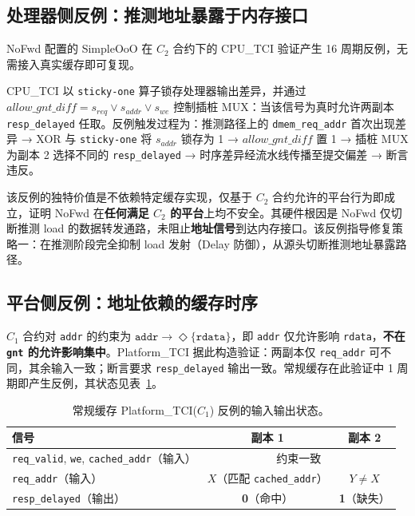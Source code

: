 \subsection{处理器侧反例：推测地址暴露于内存接口}
\label{subsec:ch5_cex_nofwd}

NoFwd 配置的 SimpleOoO 在 $C_2$ 合约下的 CPU\_TCI 验证产生 16 周期反例，无需接入真实缓存即可复现。

CPU\_TCI 以 \texttt{sticky-one} 算子锁存处理器输出差异，并通过 $\textit{allow\_gnt\_diff} = s_{\textit{req}} \vee s_{\textit{addr}} \vee s_{\textit{we}}$ 控制插桩 MUX：当该信号为真时允许两副本 \texttt{resp\_delayed} 任取。反例触发过程为：推测路径上的 \texttt{dmem\_req\_addr} 首次出现差异 → XOR 与 \texttt{sticky-one} 将 $s_{\textit{addr}}$ 锁存为 1 → $\textit{allow\_gnt\_diff}$ 置 1 → 插桩 MUX 为副本 2 选择不同的 \texttt{resp\_delayed} → 时序差异经流水线传播至提交偏差 → 断言违反。

该反例的独特价值是不依赖特定缓存实现，仅基于 $C_2$ 合约允许的平台行为即成立，证明 NoFwd 在\textbf{任何满足 $C_2$ 的平台}上均不安全。其硬件根因是 NoFwd 仅切断推测 load 的数据转发通路，未阻止\textbf{地址信号}到达内存接口。该反例指导修复策略一：在推测阶段完全抑制 load 发射（Delay 防御），从源头切断推测地址暴露路径。

\subsection{平台侧反例：地址依赖的缓存时序}
\label{subsec:ch5_cex_platform}

$C_1$ 合约对 \texttt{addr} 的约束为 $\texttt{addr} \rightarrow \Diamond\{\texttt{rdata}\}$，即 \texttt{addr} 仅允许影响 \texttt{rdata}，\textbf{不在 \texttt{gnt} 的允许影响集中}。Platform\_TCI 据此构造验证：两副本仅 \texttt{req\_addr} 可不同，其余输入一致；断言要求 \texttt{resp\_delayed} 输出一致。常规缓存在此验证中 1 周期即产生反例，其状态见表~\ref{tab:ch5_cex_platform}。

\begin{table}[htb]
    \centering
    \caption{常规缓存 Platform\_TCI($C_1$) 反例的输入输出状态。}
    \label{tab:ch5_cex_platform}
    \small
    \begin{tabular}{lcc}
        \hline
        \textbf{信号} & \textbf{副本 1} & \textbf{副本 2} \\
        \hline
        \texttt{req\_valid}, \texttt{we}, \texttt{cached\_addr}（输入） & \multicolumn{2}{c}{约束一致} \\
        \texttt{req\_addr}（输入） & $X$（匹配 \texttt{cached\_addr}） & $Y \neq X$ \\
        \texttt{resp\_delayed}（输出） & \textbf{0}（命中） & \textbf{1}（缺失） \\
        \hline
    \end{tabular}
\end{table}

